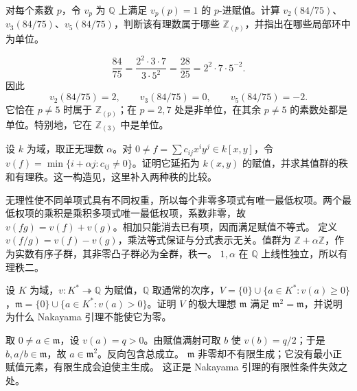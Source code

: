 \begin{exercise}\label{b3:ex:10-rational-orders}
	对每个素数 \(p\)，令 \(v_p\) 为 \(\mathbb Q\) 上满足 \(v_p(p)=1\) 的 \(p\)-进赋值。计算 \(v_2(84/75)\)、\(v_3(84/75)\)、\(v_5(84/75)\)，判断该有理数属于哪些 \(\mathbb Z_{(p)}\)，并指出在哪些局部环中为单位。
\end{exercise}
\begin{solution}
	\[
		\dfrac{84}{75}=\dfrac{2^2\cdot3\cdot7}{3\cdot5^2} =\dfrac{28}{25}=2^2\cdot7\cdot5^{-2}.
	\]
	因此
	\[
		v_2(84/75)=2,\qquad v_3(84/75)=0,\qquad v_5(84/75)=-2.
	\]
	它恰在 \(p\ne5\) 时属于 \(\mathbb Z_{(p)}\)；在 \(p=2,7\) 处是非单位，在其余 \(p\ne5\) 的素数处都是单位。特别地，它在 \(\mathbb Z_{(3)}\) 中是单位。
\end{solution}

\begin{exercise}\label{b3:ex:10-irrational-weight}
	设 \(k\) 为域，取正无理数 \(\alpha\)。对 \(0\ne f=\sum c_{ij}x^iy^j\in k[x,y]\)，令 \(v(f)=\min\{i+\alpha j:c_{ij}\ne0\}\)。证明它延拓为 \(k(x,y)\) 的赋值，并求其值群的秩和有理秩。这一构造见\cite[Exercise 10.11, p. 78]{Matsumura1989CommutativeRingTheory}，这里补入两种秩的比较。
\end{exercise}
\begin{solution}
	无理性使不同单项式具有不同权重，所以每个非零多项式有唯一最低权项。两个最低权项的乘积是乘积多项式唯一最低权项，系数非零，故 \(v(fg)=v(f)+v(g)\)。相加只能消去已有项，因而满足赋值不等式。 定义 \(v(f/g)=v(f)-v(g)\)，乘法等式保证与分式表示无关。值群为 \(\mathbb Z+\alpha\mathbb Z\)，作为实数有序子群，其非零凸子群必为全群，秩一。 \(1,\alpha\) 在 \(\mathbb Q\) 上线性独立，所以有理秩二。
\end{solution}

\begin{exercise}\label{b3:ex:10-rational-value-maximal}
	设 \(K\) 为域，\(v:K^*\twoheadrightarrow\mathbb Q\) 为赋值，\(\mathbb Q\) 取通常的次序，\(V=\{0\}\cup\{a\in K^*:v(a)\ge0\}\)，\(\mathfrak m=\{0\}\cup\{a\in K^*:v(a)>0\}\)。证明 \(V\) 的极大理想 \(\mathfrak m\) 满足 \(\mathfrak m^2=\mathfrak m\)，并说明为什么 Nakayama 引理不能使它为零。
\end{exercise}
\begin{solution}
	取 \(0\ne a\in\mathfrak m\)，设 \(v(a)=q>0\)。由赋值满射可取 \(b\) 使 \(v(b)=q/2\)；于是 \(b,a/b\in\mathfrak m\)，故 \(a\in\mathfrak m^2\)。反向包含总成立。 \(\mathfrak m\) 非零却不有限生成；它没有最小正赋值元素，有限生成会迫使主生成。 这正是 Nakayama 引理的有限性条件失效之处。
\end{solution}

